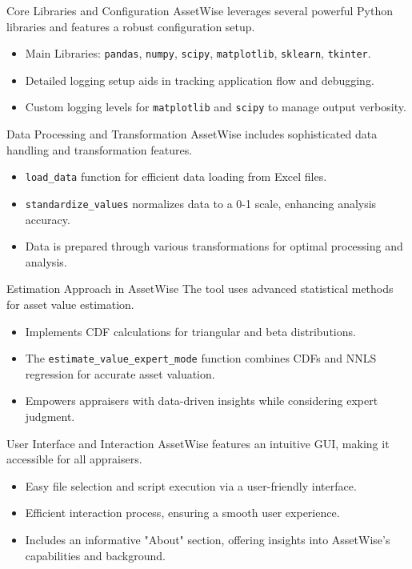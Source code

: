 \documentclass{beamer}
\begin{document}
\begin{frame}{Core Libraries and Configuration}
	AssetWise leverages several powerful Python libraries and features a robust configuration setup.
	\begin{itemize}
		\item Main Libraries: \texttt{pandas}, \texttt{numpy}, \texttt{scipy}, \texttt{matplotlib}, \texttt{sklearn}, \texttt{tkinter}.
		\item Detailed logging setup aids in tracking application flow and debugging.
		\item Custom logging levels for \texttt{matplotlib} and \texttt{scipy} to manage output verbosity.
	\end{itemize}
\end{frame}

\begin{frame}{Data Processing and Transformation}
	AssetWise includes sophisticated data handling and transformation features.
	\begin{itemize}
		\item \texttt{load\_data} function for efficient data loading from Excel files.
		\item \texttt{standardize\_values} normalizes data to a 0-1 scale, enhancing analysis accuracy.
		\item Data is prepared through various transformations for optimal processing and analysis.
	\end{itemize}
\end{frame}

\begin{frame}{Estimation Approach in AssetWise}
	The tool uses advanced statistical methods for asset value estimation.
	\begin{itemize}
		\item Implements CDF calculations for triangular and beta distributions.
		\item The \texttt{estimate\_value\_expert\_mode} function combines CDFs and NNLS regression for accurate asset valuation.
		\item Empowers appraisers with data-driven insights while considering expert judgment.
	\end{itemize}
\end{frame}

\begin{frame}{User Interface and Interaction}
	AssetWise features an intuitive GUI, making it accessible for all appraisers.
	\begin{itemize}
		\item Easy file selection and script execution via a user-friendly interface.
		\item Efficient interaction process, ensuring a smooth user experience.
		\item Includes an informative "About" section, offering insights into AssetWise's capabilities and background.
	\end{itemize}
\end{frame}
\end{document}
